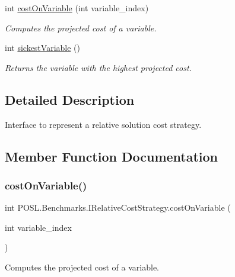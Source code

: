 \begin{DoxyCompactItemize}
int \hyperlink{interfacePOSL_1_1Benchmarks_1_1IRelativeCostStrategy_aab0193ee08a9bbe6648c1b8f6db0556a}{cost\+On\+Variable} (int variable\+\_\+index)
\begin{DoxyCompactList}\small\item\em Computes the projected cost of a variable. \end{DoxyCompactList}\item 
int \hyperlink{interfacePOSL_1_1Benchmarks_1_1IRelativeCostStrategy_ae52e1ef62b902b5e87be5f6bcdb64dbc}{sickest\+Variable} ()
\begin{DoxyCompactList}\small\item\em Returns the variable with the highest projected cost. \end{DoxyCompactList}\end{DoxyCompactItemize}


\subsection{Detailed Description}
Interface to represent a relative solution cost strategy. 

\subsection{Member Function Documentation}
\mbox{\label{interfacePOSL_1_1Benchmarks_1_1IRelativeCostStrategy_aab0193ee08a9bbe6648c1b8f6db0556a}} 
\subsubsection{\texorpdfstring{cost\+On\+Variable()}{costOnVariable()}}
{\footnotesize\ttfamily int P\+O\+S\+L.\+Benchmarks.\+I\+Relative\+Cost\+Strategy.\+cost\+On\+Variable (\begin{DoxyParamCaption}\item[{int}]{variable\+\_\+index }\end{DoxyParamCaption})}



Computes the projected cost of a variable. 


